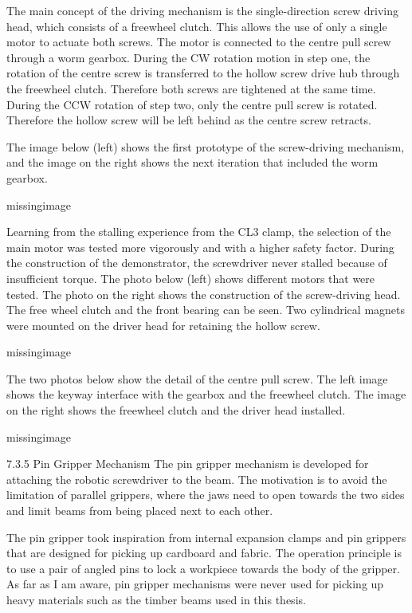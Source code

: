 The main concept of the driving mechanism is the single-direction screw driving head, which consists of a freewheel clutch. This allows the use of only a single motor to actuate both screws. The motor is connected to the centre pull screw through a worm gearbox. During the CW rotation motion in step one, the rotation of the centre screw is transferred to the hollow screw drive hub through the freewheel clutch. Therefore both screws are tightened at the same time. During the CCW rotation of step two, only the centre pull screw is rotated. Therefore the hollow screw will be left behind as the centre screw retracts.

The image below (left) shows the first prototype of the screw-driving mechanism, and the image on the right shows the next iteration that included the worm gearbox. 

missingimage

Learning from the stalling experience from the CL3 clamp, the selection of the main motor was tested more vigorously and with a higher safety factor. During the construction of the demonstrator, the screwdriver never stalled because of insufficient torque. The photo below (left) shows different motors that were tested. The photo on the right shows the construction of the screw-driving head. The free wheel clutch and the front bearing can be seen. Two cylindrical magnets were mounted on the driver head for retaining the hollow screw.

missingimage

The two photos below show the detail of the centre pull screw. The left image shows the keyway interface with the gearbox and the freewheel clutch. The image on the right shows the freewheel clutch and the driver head installed.

missingimage

7.3.5 Pin Gripper Mechanism
The pin gripper mechanism is developed for attaching the robotic screwdriver to the beam. The motivation is to avoid the limitation of parallel grippers, where the jaws need to open towards the two sides and limit beams from being placed next to each other. 

The pin gripper took inspiration from internal expansion clamps and pin grippers that are designed for picking up cardboard and fabric. The operation principle is to use a pair of angled pins to lock a workpiece towards the body of the gripper. As far as I am aware, pin gripper mechanisms were never used for picking up heavy materials such as the timber beams used in this thesis.


